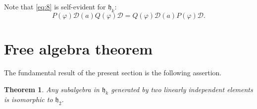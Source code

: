 \documentclass[a4paper]{article}
\newtheorem{theorem}{Theorem}
\begin{document}
Note that \eqref{eq:8} is self-evident for $\mathfrak{h}_k$:
\begin{equation*}
	P(\varphi) \mathscr{D}(a) Q(\varphi) \mathscr{D} = 
	Q(\varphi) \mathscr{D}(a) P(\varphi) \mathscr{D}.
\end{equation*}

\section{Free algebra theorem}
\label{sec:2}

The fundamental result of the present section is the following assertion.

\begin{theorem}
	\label{thm:5}
	Any subalgebra in $\mathfrak{h}_k$ generated by two linearly independent elements is isomorphic to $\mathfrak{h}_2$.
\end{theorem}
\end{document}
